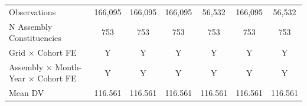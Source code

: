 \begin{tabular}{lcccccc}
\hline
Observations&     166,095         &     166,095         &     166,095         &      56,532         &     166,095         &      56,532         \\
N Assembly Constituencies&         753         &         753         &         753         &         753         &         753         &         753         \\
Grid $\times$ Cohort FE&           Y         &           Y         &           Y         &           Y         &           Y         &           Y         \\
Assembly $\times$ Month-Year $\times$ Cohort FE&           Y         &           Y         &           Y         &           Y         &           Y         &           Y         \\
Mean DV     &     116.561         &     116.561         &     116.561         &     116.561         &     116.561         &     116.561         \\
\hline
\end{tabular}
